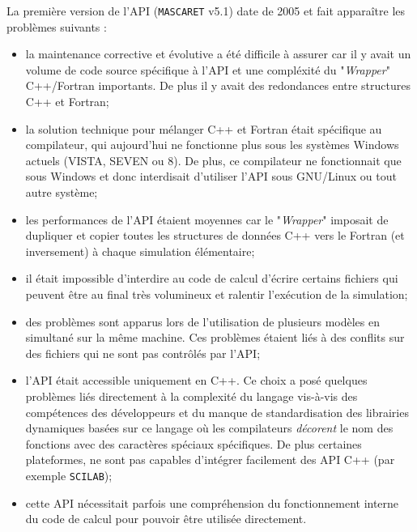 \documentclass[a4paper,11pt]{article}
\begin{document}
 La premi\`ere version de l'API (\texttt{MASCARET} v5.1) date de 2005 et fait appara\^itre les probl\`emes suivants :
 
 \vspace{0.5cm}
 
 \begin{itemize}
 
   \item la maintenance corrective et \'evolutive a \'et\'e difficile \`a assurer car il y avait un volume de code source sp\'ecifique \`a l'API et une compl\'exit\'e du "\textit{Wrapper}" C++/Fortran importants.
         De plus il y avait des redondances entre structures C++ et Fortran;
         \vspace{0.5cm}
   \item la solution technique pour m\'elanger C++ et Fortran \'etait sp\'ecifique au compilateur, qui aujourd'hui ne fonctionne plus sous les syst\`emes Windows actuels (VISTA, SEVEN ou 8).
         De plus, ce compilateur ne fonctionnait que sous Windows et donc interdisait d'utiliser l'API sous GNU/Linux ou tout autre syst\`eme;
         \vspace{0.5cm}
   \item les performances de l'API \'etaient moyennes car le "\textit{Wrapper}" imposait de dupliquer et copier toutes les structures de donn\'ees C++ vers le Fortran (et inversement) \`a chaque simulation \'el\'ementaire;
         \vspace{0.5cm}
   \item il \'etait impossible d'interdire au code de calcul d'\'ecrire certains fichiers qui peuvent \^etre au final tr\`es volumineux et ralentir l'ex\'ecution de la simulation;
         \vspace{0.5cm}
   \item des probl\`emes sont apparus lors de l'utilisation de plusieurs mod\`eles en simultan\'e sur la m\^eme machine. Ces probl\`emes \'etaient li\'es \`a des conflits sur des fichiers qui ne sont pas contr\^ol\'es par l'API;
         \vspace{0.5cm}
   \item l'API \'etait accessible uniquement en C++. Ce choix a pos\'e quelques probl\`emes li\'es directement \`a la complexit\'e du langage vis-\`a-vis des comp\'etences des d\'eveloppeurs et du manque de standardisation des librairies dynamiques bas\'ees sur ce langage o\`u les compilateurs \textit{d\'ecorent} le nom des fonctions avec des caract\`eres sp\'eciaux sp\'ecifiques. 
         De plus certaines plateformes, ne sont pas capables d'int\'egrer facilement des API C++ (par exemple \texttt{SCILAB});
         \vspace{0.5cm}
   \item cette API n\'ecessitait parfois une compr\'ehension du fonctionnement interne du code de calcul pour pouvoir \^etre utilis\'ee directement.
 
 \end{itemize}
\end{document}
